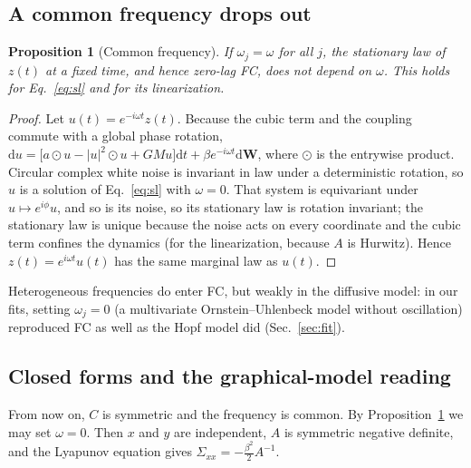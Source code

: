\documentclass[aip,cha,reprint,amsmath,amssymb]{revtex4-2}
\newtheorem{proposition}{Proposition}
\theoremstyle{remark}
\begin{document}
\subsection{A common frequency drops out}

\begin{proposition}[Common frequency]\label{prop:omega}
If $\omega_j=\omega$ for all $j$, the stationary law of $z(t)$ at a fixed time, and hence zero-lag FC, does not depend on $\omega$. This holds for Eq.~\eqref{eq:sl} and for its linearization.
\end{proposition}

\begin{proof}
Let $u(t)=e^{-i\omega t}z(t)$. Because the cubic term and the coupling commute with a global phase rotation,
$\mathrm du=\bigl[a\odot u-|u|^2\odot u+GMu\bigr]\mathrm dt+\beta e^{-i\omega t}\mathrm d\mathbf W$, where $\odot$ is the entrywise product. Circular complex white noise is invariant in law under a deterministic rotation, so $u$ is a solution of Eq.~\eqref{eq:sl} with $\omega=0$. That system is equivariant under $u\mapsto e^{i\phi}u$, and so is its noise, so its stationary law is rotation invariant; the stationary law is unique because the noise acts on every coordinate and the cubic term confines the dynamics (for the linearization, because $A$ is Hurwitz). Hence $z(t)=e^{i\omega t}u(t)$ has the same marginal law as $u(t)$.
\end{proof}

Heterogeneous frequencies do enter FC, but weakly in the diffusive model: in our fits, setting $\omega_j=0$ (a multivariate Ornstein--Uhlenbeck model without oscillation) reproduced FC as well as the Hopf model did (Sec.~\ref{sec:fit}).

\subsection{Closed forms and the graphical-model reading}

From now on, $C$ is symmetric and the frequency is common. By Proposition~\ref{prop:omega} we may set $\omega=0$. Then $x$ and $y$ are independent, $A$ is symmetric negative definite, and the Lyapunov equation gives $\Sigma_{xx}=-\tfrac{\beta^2}{2}A^{-1}$.
\end{document}
